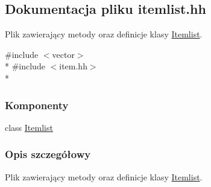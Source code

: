 \hypertarget{itemlist_8hh}{\subsection{Dokumentacja pliku itemlist.\-hh}
\label{itemlist_8hh}
}


Plik zawierający metody oraz definicje klasy \hyperlink{class_itemlist}{Itemlist}.  


{\ttfamily \#include $<$vector$>$}\\*
{\ttfamily \#include $<$item.\-hh$>$}\\*
\subsubsection*{Komponenty}
\begin{DoxyCompactItemize}
\item 
class \hyperlink{class_itemlist}{Itemlist}
\end{DoxyCompactItemize}


\subsubsection{Opis szczegółowy}
Plik zawierający metody oraz definicje klasy \hyperlink{class_itemlist}{Itemlist}. 